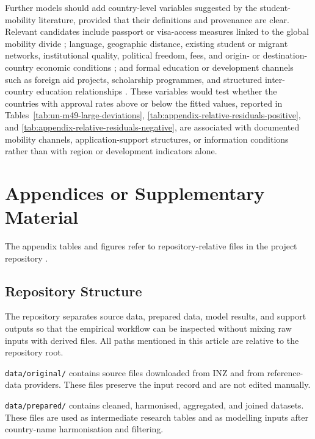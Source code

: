 \documentclass[runningheads]{llncs}
\begin{document}
Further models should add country-level variables suggested by the student-mobility literature, provided that their definitions and provenance are clear. Relevant candidates include passport or visa-access measures linked to the global mobility divide \cite{Shachar2014,Neumayer2006,Mau2015,Gulel2025}; language, geographic distance, existing student or migrant networks, institutional quality, political freedom, fees, and origin- or destination-country economic conditions \cite{PerkinsNeumayer2014,Abbott2016,Bessey2012}; and formal education or development channels such as foreign aid projects, scholarship programmes, and structured inter-country education relationships \cite{LanatiThiele2020,Xie2025}. These variables would test whether the countries with approval rates above or below the fitted values, reported in Tables~\ref{tab:un-m49-large-deviations}, \ref{tab:appendix-relative-residuals-positive}, and \ref{tab:appendix-relative-residuals-negative}, are associated with documented mobility channels, application-support structures, or information conditions rather than with region or development indicators alone.

\section{Appendices or Supplementary Material}

The appendix tables and figures refer to repository-relative files in the project repository \cite{KaplanINZRepo}.

\subsection{Repository Structure}
\label{app:repository-structure}

The repository separates source data, prepared data, model results, and support outputs so that the empirical workflow can be inspected without mixing raw inputs with derived files. All paths mentioned in this article are relative to the repository root.

\texttt{data/original/} contains source files downloaded from INZ and from reference-data providers. These files preserve the input record and are not edited manually.

\texttt{data/prepared/} contains cleaned, harmonised, aggregated, and joined datasets. These files are used as intermediate research tables and as modelling inputs after country-name harmonisation and filtering.
\end{document}
